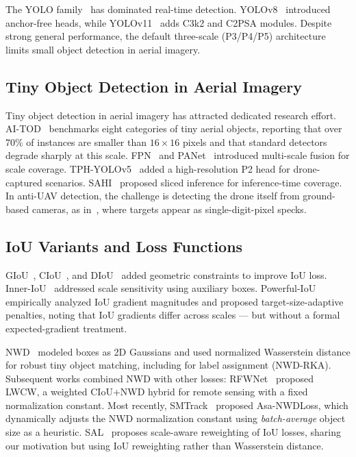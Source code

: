 \documentclass[journal]{IEEEtran}
\begin{document}
The YOLO family~\cite{redmon2016you} has dominated real-time detection. YOLOv8~\cite{yolov8_ultralytics} introduced anchor-free heads, while YOLOv11~\cite{yolo11_ultralytics} adds C3k2 and C2PSA modules. Despite strong general performance, the default three-scale (P3/P4/P5) architecture limits small object detection in aerial imagery.

\subsection{Tiny Object Detection in Aerial Imagery}

Tiny object detection in aerial imagery has attracted dedicated research effort. AI-TOD~\cite{wang2022aitod} benchmarks eight categories of tiny aerial objects, reporting that over 70\% of instances are smaller than $16 \times 16$ pixels and that standard detectors degrade sharply at this scale. FPN~\cite{lin2017feature} and PANet~\cite{liu2018path} introduced multi-scale fusion for scale coverage. TPH-YOLOv5~\cite{zhu2021tph} added a high-resolution P2 head for drone-captured scenarios. SAHI~\cite{akyon2022sahi} proposed sliced inference for inference-time coverage. In anti-UAV detection, the challenge is detecting the drone itself from ground-based cameras, as in~\cite{zhao2022anti}, where targets appear as single-digit-pixel specks.

\subsection{IoU Variants and Loss Functions}

GIoU~\cite{rezatofighi2019generalized}, CIoU~\cite{zheng2020ciou}, and DIoU~\cite{zheng2020ciou} added geometric constraints to improve IoU loss. Inner-IoU~\cite{zhang2023inner} addressed scale sensitivity using auxiliary boxes. Powerful-IoU~\cite{liu2023powerful} empirically analyzed IoU gradient magnitudes and proposed target-size-adaptive penalties, noting that IoU gradients differ across scales --- but without a formal expected-gradient treatment.

NWD~\cite{wang2022nwd} modeled boxes as 2D Gaussians and used normalized Wasserstein distance for robust tiny object matching, including for label assignment (NWD-RKA). Subsequent works combined NWD with other losses: RFWNet~\cite{lei2025rfwnet} proposed LWCW, a weighted CIoU+NWD hybrid for remote sensing with a fixed normalization constant. Most recently, SMTrack~\cite{zhong2025asanwd} proposed Asa-NWDLoss, which dynamically adjusts the NWD normalization constant using \emph{batch-average} object size as a heuristic. SAL~\cite{li2025sal} proposes scale-aware reweighting of IoU losses, sharing our motivation but using IoU reweighting rather than Wasserstein distance.
\end{document}

